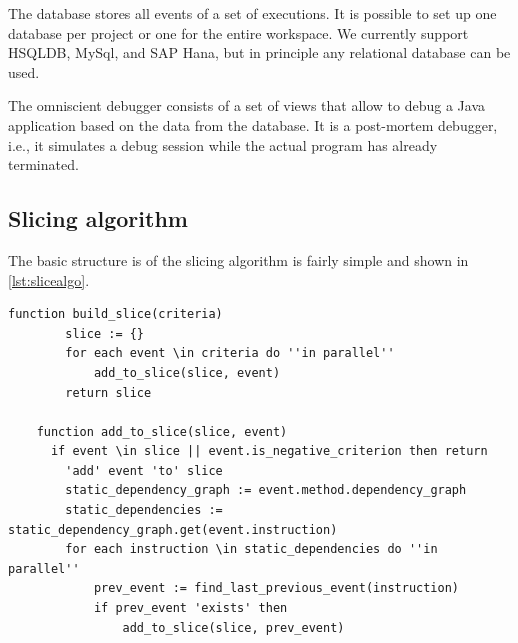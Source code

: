 ﻿\documentclass[
      english,
      ]{llncs}
\begin{document}
The database stores all events of a set of executions.
It is possible to set up one database per project or one for the entire workspace.
We currently support HSQLDB, MySql, and SAP Hana, but in principle any relational database can be used.

The omniscient debugger consists of a set of views that allow to debug a Java application based on the data from the database.
It is a post-mortem debugger, i.e., it simulates a debug session while the actual program has already terminated.

\subsection{Slicing algorithm}

The basic structure is of the slicing algorithm is fairly simple and shown in \cref{lst:slicealgo}.

\begin{lstlisting}[numberfirstline=true,float,language=algorithm,firstnumber=1,label=lst:slicealgo,caption={Algorithm for building the slice}]
	function build_slice(criteria)
		slice := {}
		for each event \in criteria do ''in parallel''
			add_to_slice(slice, event)
		return slice
		
	function add_to_slice(slice, event)
	  if event \in slice || event.is_negative_criterion then return
		'add' event 'to' slice
		static_dependency_graph := event.method.dependency_graph
		static_dependencies := static_dependency_graph.get(event.instruction)
		for each instruction \in static_dependencies do ''in parallel''
			prev_event := find_last_previous_event(instruction)
			if prev_event 'exists' then
				add_to_slice(slice, prev_event)
\end{lstlisting}

\end{document}

